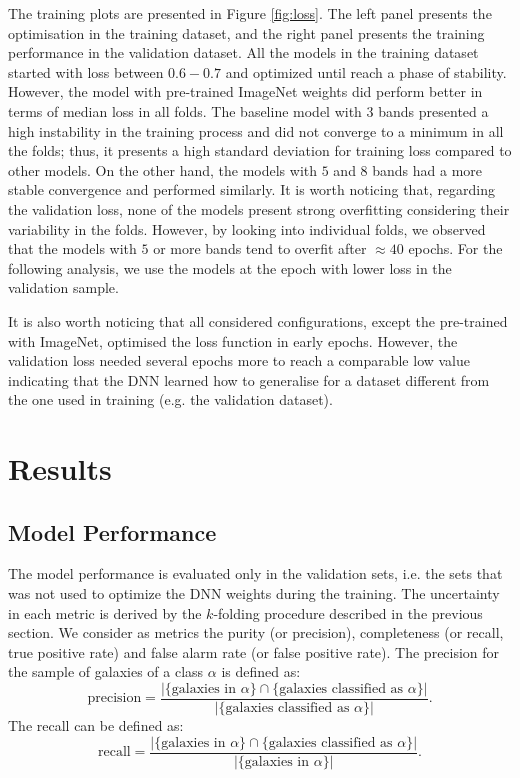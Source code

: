 \documentclass[fleqn,usenatbib]{mnras}
\begin{document}
The training plots are presented in Figure   \ref{fig:loss}. The left panel presents the optimisation in the training dataset, and the right panel presents the training performance in the validation dataset. All the models in the training dataset started with loss between $0.6-0.7$ and optimized until reach a phase of stability. However, the model with pre-trained ImageNet weights did perform better in terms of median loss in all folds. The baseline model with $3$ bands presented a high instability in the training process and did not converge to a minimum in all the folds; thus, it presents a high standard deviation for training loss compared to other models. On the other hand, the models with $5$ and $8$ bands had a more stable convergence and performed similarly. It is worth noticing that, regarding the validation loss, none of the models present strong overfitting considering their variability in the folds. However, by looking into individual folds, we observed that the models with $5$ or more bands tend to overfit after $\approx 40$ epochs. For the following analysis, we use the models at the epoch with lower loss in the validation sample.

 It is also worth noticing that all considered configurations, except the pre-trained with ImageNet, optimised the loss function in early epochs. However, the validation loss needed several epochs more to reach a comparable low value indicating that the DNN learned how to generalise for a dataset different from the one used in training (e.g. the validation dataset).

\section{Results}
\label{sec:results}

\subsection{Model Performance}
\label{sec:model performance}
The model performance is evaluated only in the validation sets, i.e. the sets that was not used to optimize the DNN weights during the training.  The uncertainty in each metric is derived by the $k$-folding procedure described in the previous section. We consider as metrics the purity (or precision), completeness (or recall, true positive rate) and false alarm rate (or false positive rate). The precision for the sample of galaxies of a class $\alpha$ is defined as:
\begin{equation}
\text{precision}=\frac{|\{\text{galaxies in $\alpha$}\}\cap\{\text{galaxies classified as $\alpha$}\}|}{|\{\text{galaxies classified as $\alpha$}\}|}.
\end{equation}
The recall can be defined as:
\begin{equation}
\text{recall}=\frac{|\{\text{galaxies in $\alpha$}\}\cap\{\text{galaxies classified as $\alpha$}\}|}{|\{\text{galaxies in $\alpha$}\}|}.
\end{equation}
\end{document}
